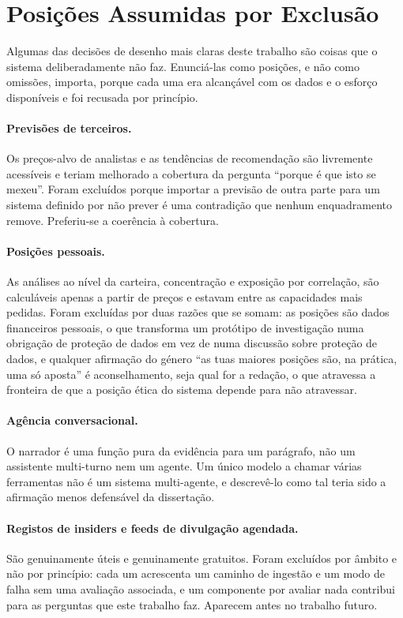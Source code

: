 \section{Posições Assumidas por Exclusão}
\label{sec:concl_exclusions}

Algumas das decisões de desenho mais claras deste trabalho são coisas que o sistema deliberadamente
não faz. Enunciá-las como posições, e não como omissões, importa, porque cada uma era alcançável com
os dados e o esforço disponíveis e foi recusada por princípio.

\paragraph{Previsões de terceiros.} Os preços-alvo de analistas e as tendências de recomendação são
livremente acessíveis e teriam melhorado a cobertura da pergunta ``porque é que isto se mexeu''.
Foram excluídos porque importar a previsão de outra parte para um sistema definido por não prever é
uma contradição que nenhum enquadramento remove. Preferiu-se a coerência à cobertura.

\paragraph{Posições pessoais.} As análises ao nível da carteira, concentração e exposição por
correlação, são calculáveis apenas a partir de preços e estavam entre as capacidades mais pedidas.
Foram excluídas por duas razões que se somam: as posições são dados financeiros pessoais, o que
transforma um protótipo de investigação numa obrigação de proteção de dados em vez de numa discussão
sobre proteção de dados, e qualquer afirmação do género ``as tuas maiores posições são, na prática,
uma só aposta'' é aconselhamento, seja qual for a redação, o que atravessa a fronteira de que a
posição ética do sistema depende para não atravessar.

\paragraph{Agência conversacional.} O narrador é uma função pura da evidência para um parágrafo, não
um assistente multi-turno nem um agente. Um único modelo a chamar várias ferramentas não é um
sistema multi-agente, e descrevê-lo como tal teria sido a afirmação menos defensável da dissertação.

\paragraph{Registos de insiders e feeds de divulgação agendada.} São genuinamente úteis e
genuinamente gratuitos. Foram excluídos por âmbito e não por princípio: cada um acrescenta um
caminho de ingestão e um modo de falha sem uma avaliação associada, e um componente por avaliar nada
contribui para as perguntas que este trabalho faz. Aparecem antes no trabalho futuro.

